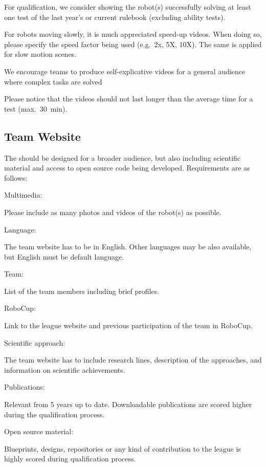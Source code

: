For qualification, we consider showing the robot(s) successfully solving at least one test of the last year's or current rulebook (excluding ability tests).

For robots moving slowly, it is much appreciated speed-up videos. When doing so, please specify the speed factor being used (e.g.~2x, 5X, 10X). The same is applied for slow motion scenes.

We encourage teams to produce self-explicative videos for a general audience where complex tasks are solved

Please notice that the videos should not last longer than the average time for a test (max.~\SI{30}{\minute}).

\subsection{Team Website}

The  should be designed for a broader audience, but also including scientific material and access to open source code being developed. Requirements are as follows:

\begin{enumerate}

	{\bf\item Multimedia: } Please include as many photos and videos of the robot(s) as possible.

	{\bf\item Language: } The team website has to be in English. Other languages may be also available, but English must be default language.

	{\bf\item Team: } List of the team members including brief profiles.

	{\bf\item RoboCup:} Link to the league website and previous participation of the team in RoboCup.

	{\bf\item Scientific approach: } The team website has to include research lines, description of the approaches, and information on scientific achievements.

	{\bf\item Publications: } Relevant  from 5 years up to date. Downloadable publications are scored higher during the qualification process.

	{\bf\item Open source material: } Blueprints, designs, repositories or any kind of contribution to the league is highly scored during qualification process.
\end{enumerate}


